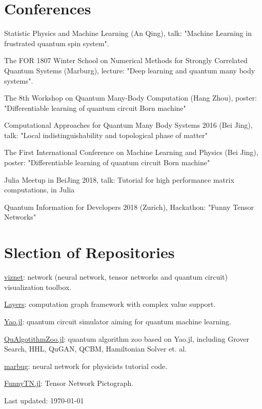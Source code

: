 \documentclass[letterpaper]{article}
\def\footerlink{}   %
\renewenvironment{itemize}{
  \begin{list}{}{
    \setlength{\leftmargin}{1.5em}
  }
}{
  \end{list}
}
\begin{document}
\section*{Conferences}
\begin{itemize}
    \item [1] Statistic Physics and Machine Learning (An Qing), talk: "Machine Learning in frustrated quantum spin system".
    \item [2] The FOR 1807 Winter School on Numerical Methods for Strongly Correlated Quantum Systems (Marburg), lecture: "Deep learning and quantum many body systems".
    \item [3] The 8th Workshop on Quantum Many-Body Computation (Hang Zhou), poster: "Differentiable learning of quantum circuit Born machine"
    \item [4] Computational Approaches for Quantum Many Body Systems 2016 (Bei Jing), talk: "Local indistinguishability and topological phase of matter"
    \item [5] The First International Conference on Machine Learning and Physics (Bei Jing), poster: "Differentiable learning of quantum circuit Born machine"
    \item [6] Julia Meetup in BeiJing 2018, talk: Tutorial for high performance matrix computations, in Julia
    \item [7] Quantum Information for Developers 2018 (Zurich), Hackathon: "Funny Tensor Networks"
\end{itemize}

\section*{Slection of Repositories}
\begin{itemize}
    \item \href{https://github.com/GiggleLiu/viznet}{viznet}: network (neural network, tensor networks and quantum circuit) visualization toolbox.
    \item \href{https://github.com/GiggleLiu/poorman\_nn}{Layers}: computation graph framework with complex value support.
    \item \href{https://github.com/QuantumBFS/Yao.jl}{Yao.jl}: quantum circuit simulator aiming for quantum machine learning.
    \item \href{https://github.com/QuantumBFS/QuAlgorithmZoo.jl}{QuAlgotithmZoo.jl}: quantum algorithm zoo based on Yao.jl, including Grover Search, HHL, QuGAN, QCBM, Hamiltonian Solver et. al.
    \item \href{https://github.com/GiggleLiu/marburg}{marbug}: neural network for physicists tutorial code.
    \item \href{https://travis-ci.com/QuantumBFS/FunnyTN.jl}{FunnyTN.jl}: Tensor Network Pictograph.
\end{itemize}

\bigskip

\begin{center}
  \begin{footnotesize}
    Last updated: \today \\
    \href{\footerlink}{\texttt{\footerlink}}
  \end{footnotesize}
\end{center}
\end{document}

